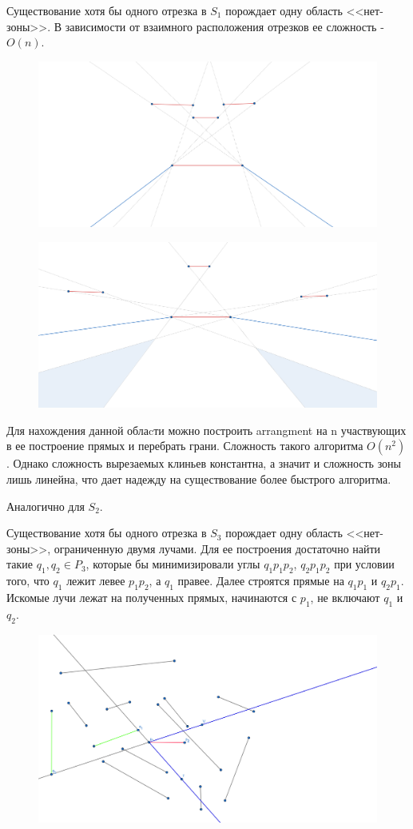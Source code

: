 \documentclass[letterpaper,12pt]{article}
\begin{document}
Существование хотя бы одного отрезка в $S_1$ порождает
одну область <<нет-зоны>>. В зависимости от взаимного
расположения отрезков ее сложность - $O(n)$.

\begin{figure}[H]
      \centering
      \includegraphics[width=0.5\linewidth]{no_zone_S1_simple.png}
\end{figure}

\begin{figure}[H]
      \centering
      \includegraphics[width=0.5\linewidth]{no_zone_S1_hard.png}
\end{figure}

Для нахождения данной облаcти можно построить arrangment
на n участвующих в ее построение прямых и перебрать грани.
Сложность такого алгоритма $O(n^2)$. Однако сложность
вырезаемых клиньев константна, а значит и сложность зоны
лишь линейна, что дает надежду на существование более быстрого
алгоритма.

Аналогично для $S_2$.

Существование хотя бы одного отрезка в $S_3$ порождает
одну область <<нет-зоны>>, ограниченную двумя лучами.
Для ее построения достаточно найти такие  $q_1, q_2 \in P_3$,
которые бы минимизировали углы $q_1 p_1 p_2$, $q_2 p_1 p_2$
при условии того, что $q_1$ лежит левее $p_1 p_2$, а $q_1$
правее. Далее строятся прямые на $q_1 p_1$ и $q_2 p_1$. 
Искомые лучи лежат на полученных прямых, начинаются с 
$p_1$, не включают $q_1$ и $q_2$.
\begin{figure}[H]
      \centering
      \includegraphics[width=0.5\linewidth]{rays_3.png}
\end{figure}
\end{document}
